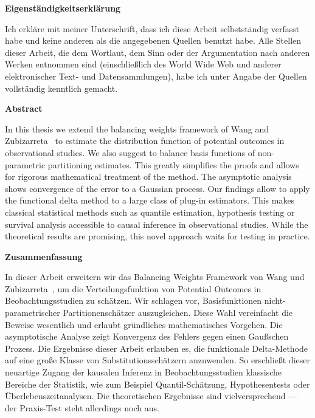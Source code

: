 \documentclass[11pt, a4paper, BCOR=7mm, DIV=11, headinclude=true]{scrbook}
\theoremstyle{definition}
\theoremstyle{plain}
\begin{document}
\newpage
\begin{center}
\textbf{
Eigenständigkeitserklärung
}
\end{center}
Ich erkläre mit meiner Unterschrift,
dass ich diese Arbeit selbstständig verfasst habe und keine
anderen als die angegebenen Quellen benutzt habe.
Alle Stellen dieser Arbeit, die dem Wortlaut,
dem Sinn oder der Argumentation nach anderen Werken entnommen sind 
(einschließlich des World
Wide Web und anderer elektronischer Text- und Datensammlungen), habe ich unter Angabe der
Quellen vollständig kenntlich gemacht.
\newpage
  \begin{center}
  \textbf{Abstract}
  \end{center}
  In this thesis we extend the balancing weights framework of
  Wang and Zubizarreta~\cite{Wang2019} to estimate the distribution function of potential outcomes in observational studies.
  We also suggest to balance basis functions of non-parametric partitioning estimates. 
  This greatly simplifies the proofs and allows for rigorous mathematical treatment of the method.
  The asymptotic analysis shows convergence of the error to a Gaussian process.
  Our findings allow to apply the functional delta method to a large class of plug-in estimators.
  This makes classical statistical methods such as quantile estimation, hypothesis testing or survival analysis accessible to causal inference in observational studies.
  While the theoretical results are promising, this novel approach waits for testing in practice.
\newpage
  \begin{center}
  \textbf{Zusammenfassung}
  \end{center}
  In dieser Arbeit erweitern wir das Balancing Weights Framework von
  Wang und Zubizarreta~\cite{Wang2019}, um die Verteilungsfunktion von Potential Outcomes in Beobachtungsstudien zu schätzen.
  Wir schlagen vor, Basisfunktionen nicht-parametrischer 
  Partitionenschätzer
  auszugleichen.
  Diese Wahl vereinfacht die Beweise wesentlich und erlaubt gründliches mathematisches Vorgehen.
  Die asymptotische Analyse zeigt Konvergenz des Fehlers gegen einen Gaußschen Prozess.
  Die Ergebnisse dieser Arbeit erlauben es, die funktionale Delta-Methode auf eine große Klasse von Substitutionsschätzern anzuwenden.
  So erschließt dieser neuartige Zugang der kausalen Inferenz in Beobachtungsstudien klassische Bereiche der Statistik, wie zum Beispiel Quantil-Schätzung, Hypothesentests oder Überlebenszeitanalysen.
  Die theoretischen Ergebnisse sind vielversprechend --- der Praxis-Test steht allerdings noch aus.
\tableofcontents 
\mainmatter
{}
\end{document}

